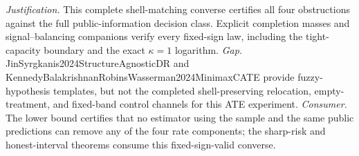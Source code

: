 \documentclass{article}
\begin{document}
\par\smallskip\noindent \textit{Justification.} This complete shell-matching converse certifies all four obstructions against the full public-information decision class. Explicit completion masses and signal--balancing companions verify every fixed-sign law, including the tight-capacity boundary and the exact \(\kappa=1\) logarithm. \textit{Gap.} JinSyrgkanis2024StructureAgnosticDR and KennedyBalakrishnanRobinsWasserman2024MinimaxCATE provide fuzzy-hypothesis templates, but not the completed shell-preserving relocation, empty-treatment, and fixed-band control channels for this ATE experiment. \textit{Consumer.} The lower bound certifies that no estimator using the sample and the same public predictions can remove any of the four rate components; the sharp-risk and honest-interval theorems consume this fixed-sign-valid converse.
\end{document}

